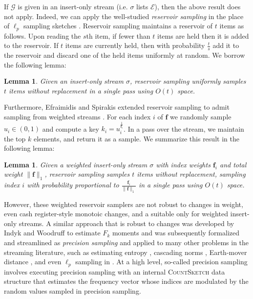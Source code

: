 \documentclass{report}
\newtheorem{lemma}[theorem]{Lemma}
\newcommand{\algoname}[1]{\textnormal{\textsc{#1}}}
\begin{document}
If $\mathcal{G}$ is given in an insert-only stream (i.e. $\sigma$ lists $\mathcal{E}$), then the above result does not apply.
Indeed, we can apply the well-studied \emph{reservoir sampling} in the place of $\ell_p$ sampling sketches \cite{vitter1985random}.
Reservoir sampling maintains a reservoir of $t$ items as follows. 
Upon reading the $s$th item, if fewer than $t$ items are held then it is added to the reservoir.
If $t$ items are currently held, then with probability $\frac{t}{s}$ add it to the reservoir and discard one of the held items uniformly at random.
We borrow the following lemma:
%
\begin{lemma} \label{lem:reservoir}
Given an insert-only stream $\sigma$, reservoir sampling uniformly samples $t$ items without replacement in a single pass using $O(t)$ space. 
\end{lemma}
%

Furthermore, Efraimidis and Spirakis extended reservoir sampling to admit sampling from weighted streams \cite{efraimidis2006weighted}.
For each index $i$ of $\mathbf{f}$ we randomly sample $u_i \in (0,1)$ and compute a key $k_i = u_i ^ {\frac{1}{\mathbf{f}_i}}$.
In a pass over the stream, we maintain the top $k$ elements, and return it as a sample.
We summarize this result in the following lemma:
%
\begin{lemma} \label{lem:reservoir:weighted}
Given a weighted insert-only stream $\sigma$ with index weights $\mathbf{f}_i$ and total weight $\|\mathbf{f}\|_1$, reservoir sampling samples $t$ items without replacement, sampling index $i$ with probability proportional to $\frac{\mathbf{f}_i}{\|\mathbf{f}\|_1}$ in a single pass using $O(t)$ space. 
\end{lemma}
%

However, these weighted reservoir samplers are not robust to changes in weight, even cash register-style monotoic changes, and a suitable only for weighted insert-only streams.
A similar approach that is robust to changes was developed by Indyk and Woodruff to estimate $F_k$ moments \cite{indyk2005optimal} and was subsequently formalized and streamlined as \emph{precision sampling} \cite{andoni2011streaming} and applied to many other problems in the streaming literature, such as estimating entropy \cite{bhuvanagiri2006estimating}, cascading norms \cite{jayram2009data}, Earth-mover distance \cite{andoni2009efficient}, and even $\ell_p$ sampling in \cite{monemizadeh20101, jowhari2011tight}. 
At a high level, so-called precision sampling involves executing precision sampling with an internal \algoname{CountSketch} data structure that estimates the frequency vector whose indices are modulated by the random values sampled in precision sampling. 
 
\end{document}
